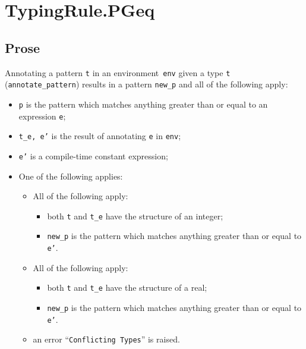 \documentclass{book}
\begin{document}

\section{TypingRule.PGeq \label{sec:TypingRule.PGeq}}

  \subsection{Prose}
   Annotating a pattern \texttt{t} in an environment~\texttt{env} given a type \texttt{t} (\texttt{annotate\_pattern}) results in a pattern \texttt{new\_p} and all of the following apply:
   \begin{itemize}
   \item \texttt{p} is the pattern which matches anything greater than or equal to an expression \texttt{e};
   \item \texttt{t\_e, e'} is the result of annotating \texttt{e} in \texttt{env}; 
   \item \texttt{e'} is a compile-time constant expression;
   \item One of the following applies:
     \begin{itemize}
     \item All of the following apply:
           \begin{itemize}
           \item both \texttt{t} and \texttt{t\_e} have the structure of an integer;
           \item \texttt{new\_p} is the pattern which matches anything greater than or equal to \texttt{e'}.
           \end{itemize}
     \item All of the following apply:
           \begin{itemize}
           \item both \texttt{t} and \texttt{t\_e} have the structure of a real;
           \item \texttt{new\_p} is the pattern which matches anything greater than or equal to \texttt{e'}.
           \end{itemize} 
     \item an error ``\texttt{Conflicting Types}'' is raised.
     \end{itemize}
   \end{itemize}
\end{document}
